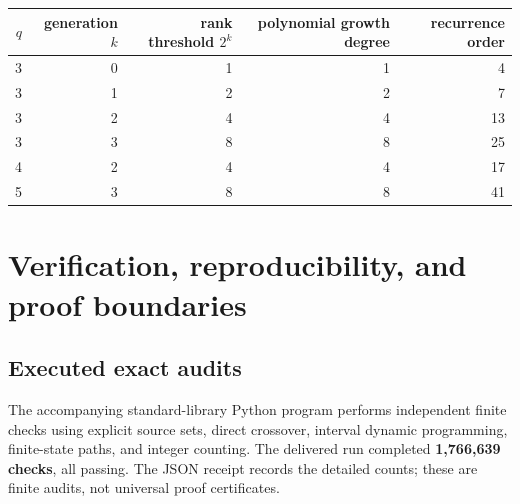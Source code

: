 \documentclass[11pt,letterpaper]{article}
\theoremstyle{definition}
\theoremstyle{remark}
\begin{document}
\begin{center}\small
\begin{tabular}{@{}rrrrr@{}}
\toprule
$q$ & generation $k$ & rank threshold $2^k$ & polynomial growth degree & recurrence order\\
\midrule
3 & 0 & 1 & 1 & 4\\
3 & 1 & 2 & 2 & 7\\
3 & 2 & 4 & 4 & 13\\
3 & 3 & 8 & 8 & 25\\
4 & 2 & 4 & 4 & 17\\
5 & 3 & 8 & 8 & 41\\
\bottomrule
\end{tabular}
\end{center}

\section{Verification, reproducibility, and proof boundaries}
\label{ccc:sec:verification}

\subsection{Executed exact audits}

The accompanying standard-library Python program performs independent finite
checks using explicit source sets, direct crossover, interval dynamic
programming, finite-state paths, and integer counting. The delivered run
completed \textbf{1,766,639 checks}, all passing. The JSON receipt records
the detailed counts; these are finite audits, not universal proof certificates.
\end{document}
